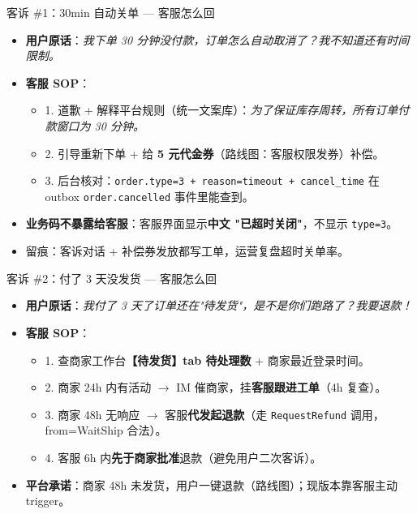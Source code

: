 \documentclass[aspectratio=169,11pt]{beamer}
\begin{document}
\begin{frame}[shrink]{客诉 \#1：30min 自动关单 — 客服怎么回}
\begin{itemize}
  \item \textbf{用户原话}：\textit{我下单 30 分钟没付款，订单怎么自动取消了？我不知道还有时间限制。}
  \item \textbf{客服 SOP}：
  \begin{itemize}
    \item 1. 道歉 + 解释平台规则（统一文案库）：\textit{为了保证库存周转，所有订单付款窗口为 30 分钟。}
    \item 2. 引导重新下单 + 给 \textbf{5 元代金券}（路线图：客服权限发券）补偿。
    \item 3. 后台核对：\texttt{order.type=3 + reason=timeout + cancel\_time} 在 outbox \texttt{order.cancelled} 事件里能查到。
  \end{itemize}
  \item \textbf{业务码不暴露给客服}：客服界面显示\textbf{中文 "已超时关闭"}，不显示 \texttt{type=3}。
  \item 留痕：客诉对话 + 补偿券发放都写工单，运营复盘超时关单率。
\end{itemize}
\end{frame}

\begin{frame}[shrink]{客诉 \#2：付了 3 天没发货 — 客服怎么回}
\begin{itemize}
  \item \textbf{用户原话}：\textit{我付了 3 天了订单还在"待发货"，是不是你们跑路了？我要退款！}
  \item \textbf{客服 SOP}：
  \begin{itemize}
    \item 1. 查商家工作台\textbf{【待发货】tab 待处理数} + 商家最近登录时间。
    \item 2. 商家 24h 内有活动 $\to$ IM 催商家，挂\textbf{客服跟进工单}（4h 复查）。
    \item 3. 商家 48h 无响应 $\to$ 客服\textbf{代发起退款}（走 \texttt{RequestRefund} 调用，from=WaitShip 合法）。
    \item 4. 客服 6h 内\textbf{先于商家批准}退款（避免用户二次客诉）。
  \end{itemize}
  \item \textbf{平台承诺}：商家 48h 未发货，用户一键退款（路线图）；现版本靠客服主动 trigger。
\end{itemize}
\end{frame}
\end{document}

